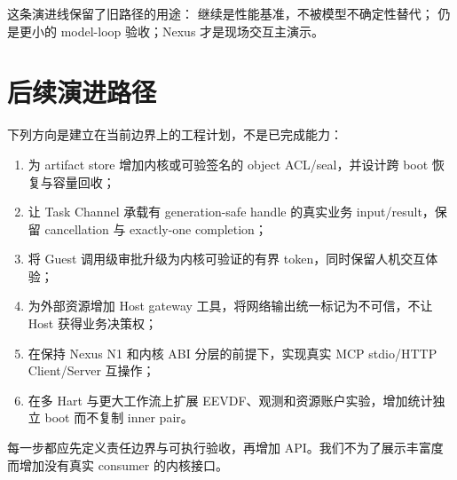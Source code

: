 这条演进线保留了旧路径的用途： 继续是性能基准，不被模型不确定性替代； 仍是更小的 model-loop 验收；Nexus 才是现场交互主演示。

\section{后续演进路径}

下列方向是建立在当前边界上的工程计划，不是已完成能力：

\begin{enumerate}
  \item 为 artifact store 增加内核或可验签名的 object ACL/seal，并设计跨 boot 恢复与容量回收；
  \item 让 Task Channel 承载有 generation-safe handle 的真实业务 input/result，保留 cancellation 与 exactly-one completion；
  \item 将 Guest 调用级审批升级为内核可验证的有界 token，同时保留人机交互体验；
  \item 为外部资源增加 Host gateway 工具，将网络输出统一标记为不可信，不让 Host 获得业务决策权；
  \item 在保持 Nexus N1 和内核 ABI 分层的前提下，实现真实 MCP stdio/HTTP Client/Server 互操作；
  \item 在多 Hart 与更大工作流上扩展 EEVDF、观测和资源账户实验，增加统计独立 boot 而不复制 inner pair。
\end{enumerate}

每一步都应先定义责任边界与可执行验收，再增加 API。我们不为了展示丰富度而增加没有真实 consumer 的内核接口。
